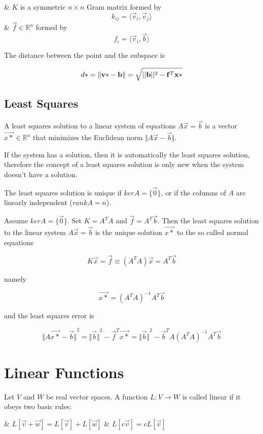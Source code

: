 \begin{easylist}[enumerate]
    & $K$ is a symmetric $n \times n$ Gram matrix formed by
        \[ k_{ij} = \langle \vec{v}_i, \vec{v}_j \rangle \]
    & $\vec{f} \in \mathbb{R}^n$ formed by
        \[ f_i = \langle \vec{v}_i, \vec{b} \rangle \]
\end{easylist}

The distance between the point and the subspace is

\[ d* = \Vert \mathbf{v*} - \mathbf{b} \Vert = \sqrt{\lvert \lvert \mathbf{b} \rvert \rvert^2 - \mathbf{f}^T \mathbf{x*}} \]

    \subsection{Least Squares}
    A least squares solution to a linear system of equations $A \vec{x} = \vec{b}$ is a vector $\vec{x*} \in \mathbb{R}^n$ that minimizes the Euclidean norm $\Vert A \vec{x} - \vec{b} \Vert$.

    If the system has a solution, then it is automatically the least squares solution, therefore the concept of a least squares solution is only new when the system doesn't have a solution.

    The least squares solution is unique if $ker A = \{\vec{0}\}$, or if the columns of $A$ are linearly independent ($rank A = n$).

    Assume $ker A = \{ \vec{0} \}$. Set $K = A^T A$ and $\vec{f} = A^T \vec{b}$. Then the least squares solution to the linear system $A \vec{x} = \vec{b}$ is the unique solution $\vec{x*}$ to the so called normal equations

    \[ K \vec{x} = \vec{f} \equiv (A^T A) \vec{x} = A^T \vec{b} \]

    namely

    \[ \vec{x*} = (A^T A)^{-1} A^T \vec{b} \]

    and the least squares error is

    \[ {\Vert A \vec{x*} - \vec{b} \Vert}^2 = {\Vert \vec{b} \Vert}^2 - \vec{f}^T \vec{x*} = {\Vert \vec{b} \Vert}^2 - \vec{b}^T A (A^T A)^{-1} A^T \vec{b} \]

\section{Linear Functions}
Let $V$ and $W$ be real vector spaces. A function $L: V \to W$ is called linear if it obeys two basic rules:

\begin{easylist}[enumerate]
    & $L[\vec{v} + \vec{w}] = L[\vec{v}] + L[\vec{w}]$
    & $L[c \vec{v}] = c L[\vec{v}]$
\end{easylist}

